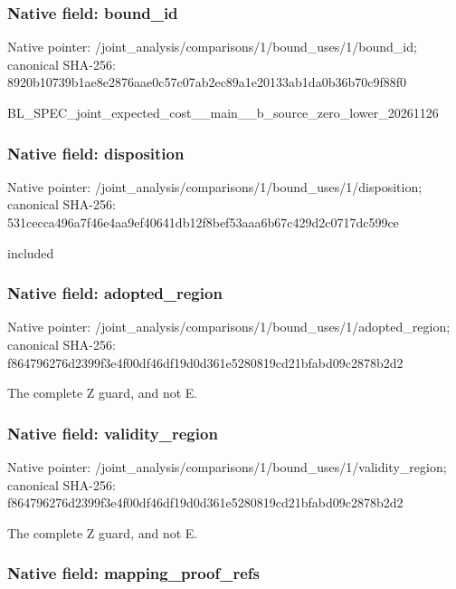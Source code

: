 \documentclass[10pt,a4paper]{article}
\begin{document}
\subsubsection{Native field: bound\_id}


Native pointer: /joint\_analysis/comparis\allowbreak{}ons/1/bound\_uses/1/bound\allowbreak{}\_id; canonical SHA-256: 8920b10739b1ae8e2876aae0\allowbreak{}c57c07ab2ec89a1e20133ab1\allowbreak{}da0b36b70c9f88f0


BL\_SPEC\_joint\_expected\_c\allowbreak{}ost\_\_main\_\_b\_source\_zero\allowbreak{}\_lower\_20261126


\subsubsection{Native field: disposition}


Native pointer: /joint\_analysis/comparis\allowbreak{}ons/1/bound\_uses/1/dispo\allowbreak{}sition; canonical SHA-256: 531cecca496a7f46e4aa9ef4\allowbreak{}0641db12f8bef53aaa6b67c4\allowbreak{}29d2c0717dc599ce


included


\subsubsection{Native field: adopted\_region}


Native pointer: /joint\_analysis/comparis\allowbreak{}ons/1/bound\_uses/1/adopt\allowbreak{}ed\_region; canonical SHA-256: f864796276d2399f3e4f00df\allowbreak{}46df19d0d361e5280819cd21\allowbreak{}bfabd09c2878b2d2


The complete Z guard, and not E.


\subsubsection{Native field: validity\_region}


Native pointer: /joint\_analysis/comparis\allowbreak{}ons/1/bound\_uses/1/valid\allowbreak{}ity\_region; canonical SHA-256: f864796276d2399f3e4f00df\allowbreak{}46df19d0d361e5280819cd21\allowbreak{}bfabd09c2878b2d2


The complete Z guard, and not E.


\subsubsection{Native field: mapping\_proof\_refs}
\end{document}
